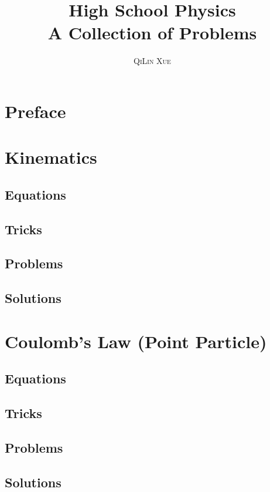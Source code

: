 \documentclass[a4paper,11pt,oneside]{book}
\title{\Huge \textbf{High School Physics} \\ \huge A Collection of Problems}
\author{\textsc{QiLin Xue}}
\begin{document}
\maketitle
\tableofcontents

\chapter*{Preface}


\chapter{Kinematics}


\section{Equations}


\section{Tricks}


\newpage
\section{Problems}


\newpage
\section{Solutions}
\printsolutions

\chapter{Coulomb's Law (Point Particle)}


\section{Equations}


\section{Tricks}


\newpage
\section{Problems}


\newpage
\section{Solutions}
\printsolutions
\end{document}
